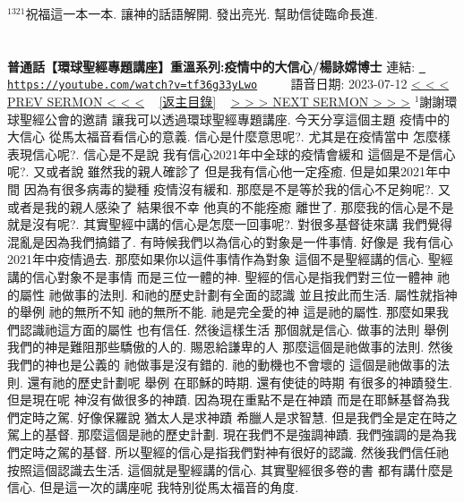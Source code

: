 \documentclass{book}
\begin{document}
$^{1321}$祝福這一本一本.
讓神的話語解開.
發出亮光.
幫助信徒臨命長進.
\newpage



\section{}
\label{sec:tf36g33yLwo}
\textbf{普通話【環球聖經專題講座】重溫系列:疫情中的大信心/楊詠嫦博士}
\newline
\newline
連結: \href{https://youtube.com/watch?v=tf36g33yLwo}{\texttt{ https://youtube.com/watch?v=tf36g33yLwo}} ~~~~ 語音日期: 2023-07-12 
\newline
\newline
\hyperref[sec:_SGZrxvXYCM]{\small{< < < PREV SERMON < < <}}
~
\hyperref[sec:index]{\small{[返主目錄]}}
~
\hyperref[sec:RIiOFAsko5U]{\small{> > > NEXT SERMON > > >}}
\newline
\newline
$^{1}$謝謝環球聖經公會的邀請 讓我可以透過環球聖經專題講座.
今天分享這個主題 疫情中的大信心 從馬太福音看信心的意義.
信心是什麼意思呢?.
尤其是在疫情當中 怎麼樣表現信心呢?.
信心是不是說 我有信心2021年中全球的疫情會緩和 這個是不是信心呢?.
又或者說 雖然我的親人確診了 但是我有信心他一定痊癒.
但是如果2021年中間 因為有很多病毒的變種 疫情沒有緩和.
那麼是不是等於我的信心不足夠呢?.
又或者是我的親人感染了 結果很不幸 他真的不能痊癒 離世了.
那麼我的信心是不是就是沒有呢?.
其實聖經中講的信心是怎麼一回事呢?.
對很多基督徒來講 我們覺得混亂是因為我們搞錯了.
有時候我們以為信心的對象是一件事情.
好像是 我有信心2021年中疫情過去.
那麼如果你以這件事情作為對象 這個不是聖經講的信心.
聖經講的信心對象不是事情 而是三位一體的神.
聖經的信心是指我們對三位一體神 祂的屬性 祂做事的法則.
和祂的歷史計劃有全面的認識 並且按此而生活.
屬性就指神的舉例 祂的無所不知 祂的無所不能.
祂是完全愛的神 這是祂的屬性.
那麼如果我們認識祂這方面的屬性 也有信任.
然後這樣生活 那個就是信心.
做事的法則 舉例 我們的神是難阻那些驕傲的人的.
賜恩給謙卑的人 那麼這個是祂做事的法則.
然後我們的神也是公義的 祂做事是沒有錯的.
祂的動機也不會壞的 這個是祂做事的法則.
還有祂的歷史計劃呢 舉例 在耶穌的時期.
還有使徒的時期 有很多的神蹟發生.
但是現在呢 神沒有做很多的神蹟.
因為現在重點不是在神蹟 而是在耶穌基督為我們定時之駕.
好像保羅說 猶太人是求神蹟 希臘人是求智慧.
但是我們全是定在時之駕上的基督.
那麼這個是祂的歷史計劃.
現在我們不是強調神蹟.
我們強調的是為我們定時之駕的基督.
所以聖經的信心是指我們對神有很好的認識.
然後我們信任祂 按照這個認識去生活.
這個就是聖經講的信心.
其實聖經很多卷的書 都有講什麼是信心.
但是這一次的講座呢 我特別從馬太福音的角度.
\end{document}
